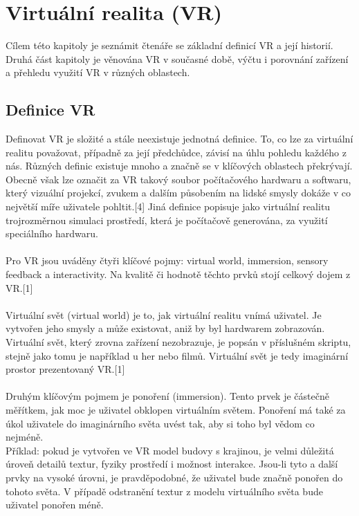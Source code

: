 \documentclass[a4paper, 12pt]{report}
\begin{document}
\chapter{Virtuální realita (VR)}
Cílem této kapitoly je seznámit čtenáře se základní definicí VR a její historií. Druhá část kapitoly je věnována VR v současné době, výčtu i porovnání zařízení a přehledu využití VR v různých oblastech.
\section{Definice VR}
Definovat VR je složité a stále neexistuje jednotná definice. To, co lze za virtuální realitu považovat, případně za její předchůdce, závisí na úhlu pohledu každého z nás. Různých definic existuje mnoho a značně se v klíčových oblastech překrývají. \\
Obecně však lze označit za VR takový soubor počítačového hardwaru a softwaru, který vizuální projekcí, zvukem a dalším působením na lidské smysly dokáže v co největší míře uživatele pohltit.[4] Jiná definice popisuje jako virtuální realitu trojrozměrnou simulaci prostředí, která je počítačově generována, za využití speciálního hardwaru.\\
\\
Pro VR jsou uváděny čtyři klíčové pojmy: virtual world, immersion, sensory feedback a interactivity. Na kvalitě či hodnotě těchto prvků stojí celkový dojem z VR.[1]\\
\\
Virtuální svět (virtual world) je to, jak virtuální realitu vnímá uživatel. Je vytvořen jeho smysly a může existovat, aniž by byl hardwarem zobrazován. Virtuální svět, který zrovna zařízení nezobrazuje, je popsán v příslušném skriptu, stejně jako tomu je například u her nebo filmů. Virtuální svět je tedy imaginární prostor prezentovaný VR.[1]\\
\\
Druhým klíčovým pojmem je ponoření (immersion). Tento prvek je částečně měřítkem, jak moc je uživatel obklopen virtuálním světem. Ponoření má také za úkol uživatele do imaginárního světa uvést tak, aby si toho byl vědom co nejméně. \\
Příklad: pokud je vytvořen ve VR model budovy s krajinou, je velmi důležitá úroveň detailů textur, fyziky prostředí i možnost interakce. Jsou-li tyto a další prvky na vysoké úrovni, je pravděpodobné, že uživatel bude značně ponořen do tohoto světa. V případě odstranění textur z modelu virtuálního světa bude uživatel ponořen méně.\\
\end{document}
